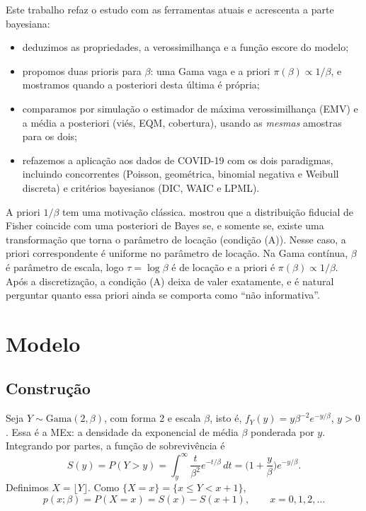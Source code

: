 \documentclass[11pt,a4paper]{article}
\begin{document}
Este trabalho refaz o estudo com as ferramentas atuais e acrescenta a parte bayesiana:
\begin{itemize}
\item deduzimos as propriedades, a verossimilhança e a função escore do modelo;
\item propomos duas prioris para $\beta$: uma Gama vaga e a priori $\pi(\beta)\propto1/\beta$, e mostramos quando a posteriori desta última é própria;
\item comparamos por simulação o estimador de máxima verossimilhança (EMV) e a média a posteriori (viés, EQM, cobertura), usando as \emph{mesmas} amostras para os dois;
\item refazemos a aplicação aos dados de COVID-19 com os dois paradigmas, incluindo concorrentes (Poisson, geométrica, binomial negativa e Weibull discreta) e critérios bayesianos (DIC, WAIC e LPML).
\end{itemize}

A priori $1/\beta$ tem uma motivação clássica. \cite{lindley1958} mostrou que a distribuição fiducial de Fisher coincide com uma posteriori de Bayes se, e somente se, existe uma transformação que torna o parâmetro de locação (condição (A)). Nesse caso, a priori correspondente é uniforme no parâmetro de locação. Na Gama contínua, $\beta$ é parâmetro de escala, logo $\tau=\log\beta$ é de locação e a priori é $\pi(\beta)\propto1/\beta$. Após a discretização, a condição (A) deixa de valer exatamente, e é natural perguntar quanto essa priori ainda se comporta como ``não informativa''.

\section{Modelo}

\subsection{Construção}

Seja $Y\sim\text{Gama}(2,\beta)$, com forma 2 e escala $\beta$, isto é, $f_Y(y)=y\beta^{-2}e^{-y/\beta}$, $y>0$. Essa é a MEx: a densidade da exponencial de média $\beta$ ponderada por $y$. Integrando por partes, a função de sobrevivência é
\begin{equation}
S(y)=P(Y>y)=\int_y^\infty \frac{t}{\beta^2}e^{-t/\beta}\,dt=\Big(1+\frac{y}{\beta}\Big)e^{-y/\beta}.
\end{equation}
Definimos $X=\lfloor Y\rfloor$. Como $\{X=x\}=\{x\le Y<x+1\}$,
\begin{equation}
p(x;\beta)=P(X=x)=S(x)-S(x+1),\qquad x=0,1,2,\dots
\end{equation}
\end{document}
